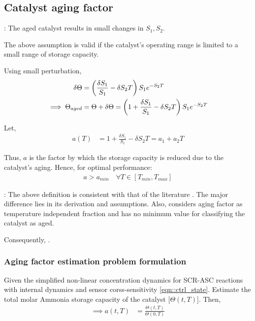 \subsection{Catalyst aging factor}

: The aged catalyst results in small changes in
$S_1, S_2$.

The above assumption is valid if the catalyst's operating range is limited to a
small range of storage capacity.

Using small perturbation,
\begin{align*}
    \delta \Theta &= \left( \frac{\delta S_1}{S_1} - \delta S_2T \right) S_1 e^{-S_2 T}\\
    \implies \Theta_{aged} &= \Theta + \delta \Theta = \left( 1 + \frac{\delta S_1}{S_1} - \delta S_2T \right) S_1 e^{-S_2 T}
\end{align*}

Let,
\begin{align*}
    a(T) &= 1 + \frac{\delta S_1}{S_1} - \delta S_2T = a_1 + a_2 T
\end{align*}

Thus, $a$ is the factor by which the storage capacity is reduced due to the
catalyst's aging. Hence, for optimal performance:
\begin{align*}
    a > a_{min} \quad \forall T \in [T_{min}, T_{max}]
\end{align*}

: The above definition is consistent with that of the literature
\cite{ma2017observer}. The major difference lies in its derivation and
assumptions. Also, \cite{ma2017observer} considers aging factor as temperature
independent fraction and has no minimum value for classifying the catalyst as aged.

Consequently, .


\subsubsection{Aging factor estimation problem formulation}
Given the simplified non-linear concentration dynamics for SCR-ASC
reactions with internal dynamics and sensor corss-sensitivity
\ref{eqn::ctrl_state}. Estimate the total molar
Ammonia storage capacity of the catalyst [$\Theta(t, T)$]. Then,
\begin{align*}
    \implies a(t, T) &= \frac{\Theta(t, T)}{\Theta(0, T)}
\end{align*}


